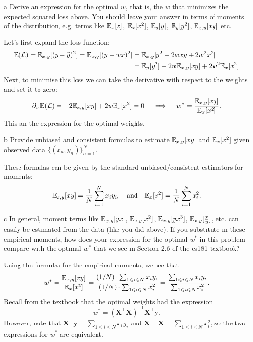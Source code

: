 \documentclass[expanded]{lkx_pset}
\begin{document}
\begin{parts}
  \begin{part}{a}
    Derive an expression for the optimal $w$, that is, the $w$
    that minimizes the expected squared loss above.  You should leave
    your answer in terms of moments of the distribution, e.g. terms
    like $\mathbb{E}_x[x]$, $\mathbb{E}_x[x^2]$, $\mathbb{E}_y[y]$, $\mathbb{E}_y[y^2]$, $\mathbb{E}_{x,y}[xy]$
    etc.
  \end{part}

  Let's first expand the loss function:
  \[
    \begin{aligned}
      \mathbb{E}(\mathcal{L}) = \mathbb{E}_{x,y}[(y-\widehat{y})^2] = \mathbb{E}_{x,y}[(y-wx)^2] 
      &= \mathbb{E}_{x,y}[y^2-2wxy+2w^2x^2]\\
      &= \mathbb{E}_{y}[y^2]-2w\mathbb{E}_{x,y}[xy]+2w^2\mathbb{E}_x[x^2]
    \end{aligned}
  \]
  Next, to minimise this loss we can take the derivative with respect to the weights and set it to zero:
  \[
    \begin{aligned}
      \partial_w \mathbb{E}(\mathcal{L}) = -2\mathbb{E}_{x,y}[xy]+2w\mathbb{E}_x[x^2] =0\quad
                                                              \implies \quad w^* = \frac{\mathbb{E}_{x,y}[xy]}{\mathbb{E}_x[x^2]}.
    \end{aligned}
  \]
  This an the expression for the optimal weights.

  \begin{part}{b}
    Provide unbiased and consistent formulas to estimate $\mathbb{E}_{x, y}[xy]$
   and $\mathbb{E}_x[x^2]$ given observed data $\{(x_n,y_n)\}_{n=1}^N$.
  \end{part}

  These formulas can be given by the standard unbiased/consistent estimators for moments:
  \[
    \mathbb{E}_{x,y}[xy] = \frac{1}{N}\sum^N_{i=1} x_i y_i,\quad\textrm{and}\quad\mathbb{E}_x[x^2]=\frac{1}{N}\sum^N_{i=1} x_i^2.
  \]

  \begin{part}{c} In general, moment terms like $\mathbb{E}_{x, y}[yx]$, $\mathbb{E}_{x, y}[x^2]$,
    $\mathbb{E}_{x, y}[yx^3]$, $\mathbb{E}_{x, y}[\frac{x}{y}]$, etc. can easily be
    estimated from the data (like you did above).  If you substitute in
    these empirical moments, how does your expression for the optimal
    $w^*$ in this problem compare with the optimal $w^*$ that we see in
    Section 2.6 of the cs181-textbook?
  \end{part}

  Using the formulas for the empirical moments, we see that
  \[
    w^* = \frac{\mathbb{E}_{x,y}[xy]}{\mathbb{E}_x[x^2]} = \frac{(1/N)\cdot\sum_{1\leqslant i \leqslant N} x_iy_i}{(1/N)\cdot \sum_{1\leqslant i \leqslant N} x_i^2} = \frac{\sum_{1\leqslant i \leqslant N} x_iy_i}{\sum_{1\leqslant i \leqslant N} x_i^2}.
  \]
  Recall from the textbook that the optimal weights had the expression
  \[
    w^* = (\mathbf{X}^\intercal \mathbf{X})^{-1}\mathbf{X}^\intercal \mathbf{y}.
  \]
  However, note that $\mathbf{X}^\intercal \mathbf{y} = \sum_{1\leq i \leq N} x_i y_i$ and $\mathbf{X}^\intercal\cdot \mathbf{X} = \sum_{1\leq i\leq N} x_i^2$, so the two expressions for $w^*$ are equivalent.


\end{parts}
\end{document}
